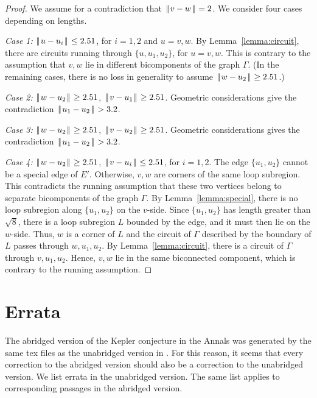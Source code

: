 \documentclass[11pt]{amsart}
\def\|{{\hskip0.1em|\hskip-0.15em|\hskip0.1em}}
\begin{document}
\begin{proof} We assume for a contradiction that $\|v-w\|=2$.
We consider four cases depending on lengths.  

{\it Case 1:} $\|u-u_i\|\le 2.51$, for $i=1,2$ and $u=v,w$.
By Lemma~\ref{lemma:circuit}, there are circuits running through
$\{u,u_1,u_2\}$, for $u=v,w$.  This is contrary to the assumption
that $v,w$ lie in different bicomponents of the graph $\Gamma$.  (In the remaining cases, there is
no loss in generality to assume $\|w-u_2\|\ge 2.51$.)

{\it Case 2:} $\|w-u_2\|\ge 2.51$, $\|v-u_1\|\ge 2.51$.
Geometric considerations give the contradiction
$\|u_1-u_2\|>3.2$.

{\it Case 3:} $\|w-u_2\|\ge 2.51$, $\|v-u_2\|\ge 2.51$.
Geometric considerations gives the contradiction
$\|u_1-u_2\|>3.2$.

{\it Case 4:} $\|w-u_2\|\ge 2.51$, $\|v-u_i\|\le 2.51$, for $i=1,2$.
The edge $\{u_1,u_2\}$ cannot be a special edge of $E'$.  Otherwise,
$v,w$ are corners of the same loop subregion.  This contradicts
the running assumption that these two vertices belong to separate
bicomponents of the graph $\Gamma$.  By Lemma~\ref{lemma:special}, there is no loop subregion along $\{u_1,u_2\}$ on the $v$-side.
Since $\{u_1,u_2\}$ has length greater than $\sqrt8$, there
is a loop subregion $L$ bounded by the edge, and it must then lie
on the $w$-side.  Thus, $w$ is a corner of $L$ and the circuit of
$\Gamma$ described by the boundary of $L$ passes through $w,u_1,u_2$.
By Lemma~\ref{lemma:circuit}, there is a circuit of $\Gamma$ through
$v,u_1,u_2$.  Hence, $v,w$ lie in the same biconnected component,
which is contrary to the running assumption.
\end{proof}



\section{Errata}


The abridged version of the Kepler conjecture
in the Annals \cite{Hales:2005:Annals}
was generated by the same tex
files as the unabridged version in \cite{Hales:2006:DCG}.
For this reason,
it seems that every correction to
the abridged version should also be a correction to the unabridged version.
We list errata in the
unabridged version. The same list applies to corresponding 
passages in the abridged version.  
\end{document}
